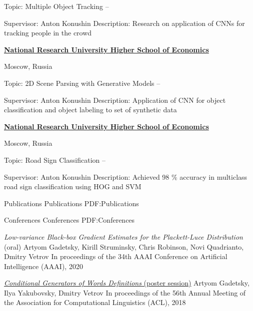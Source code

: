 \documentclass[letterpaper,MMMyyyy,nonstopmode]{simpleresumecv}
\begin{document}
\begin{Body}
\Gap
\BulletItem
Topic: Multiple Object Tracking
\hfill
{} --
\begin{Detail}
\SubBulletItem
Supervisor:
Anton Konushin
\SubBulletItem
Description:
Research on application of CNNs for tracking people in the crowd
\end{Detail}

\Gap

\Entry
\href{https://www.hse.ru/en/}
{\textbf{National Research University Higher School of Economics}}
\par
Moscow, Russia

\Gap
\BulletItem
Topic: 2D Scene Parsing with Generative Models
\hfill
{} --
\begin{Detail}
\SubBulletItem
Supervisor:
Anton Konushin
\SubBulletItem
Description:
Application of CNN for object classification and object labeling to \newline
set of synthetic data
\end{Detail}

\Gap

\Entry
\href{https://www.hse.ru/en/}
{\textbf{National Research University Higher School of Economics}}
\par
Moscow, Russia

\Gap
\BulletItem
Topic: Road Sign Classification
\hfill
{} --
\begin{Detail}
\SubBulletItem
Supervisor:
Anton Konushin
\SubBulletItem
Description:
Achieved 98 \% accuracy in multiclass road sign classification \newline
using HOG and SVM
\end{Detail}


\Section
{Publications}
{Publications}
{PDF:Publications}

\SubSection
{Conferences}
{Conferences}
{PDF:Conferences}

\Item
\textit{Low-variance Black-box Gradient Estimates for the Plackett-Luce Distribution} (oral)
\Item
Artyom Gadetsky, Kirill Struminsky, Chris Robinson, Novi Quadrianto, Dmitry Vetrov
\Item
In proceedings of the 34th AAAI Conference on Artificial Intelligence (AAAI), 2020

\Gap
\Item
\href{https://aclanthology.info/papers/P18-2043/p18-2043}{\textit{Conditional Generators of Words Definitions} (poster session)}
\Item
Artyom Gadetsky, Ilya Yakubovsky, Dmitry Vetrov
\Item
In proceedings of the 56th Annual Meeting of the \newline
Association for Computational Linguistics (ACL), 2018


\end{Body}
\end{document}
